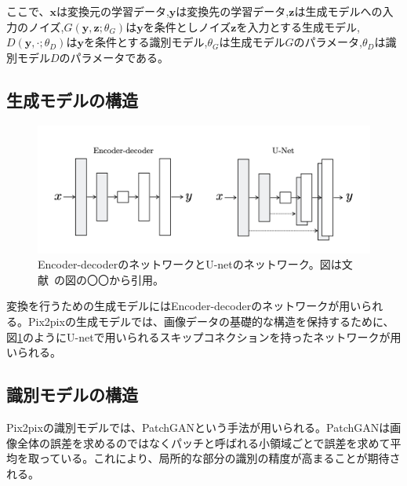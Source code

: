 ここで、$\boldsymbol{x}$は変換元の学習データ,$\boldsymbol{y}$は変換先の学習データ,$\boldsymbol{z}$は生成モデルへの入力のノイズ,$G(\boldsymbol{y},\boldsymbol{z};\theta_G)$は$\boldsymbol{y}$を条件としノイズ$\boldsymbol{z}$を入力とする生成モデル,$D(\boldsymbol{y},\cdot;\theta_D)$は$\boldsymbol{y}$を条件とする識別モデル,$\theta_G$は生成モデル$G$のパラメータ,$\theta_D$は識別モデル$D$のパラメータである。

\subsection{生成モデルの構造}

\begin{figure}[t]
\begin{center}
\includegraphics[width=\hsize]{figure/u-net.png}
\caption{Encoder-decoderのネットワークとU-netのネットワーク。図は文献~\cite{u-net}の図の〇〇から引用。}
\label{fig:u-net}
\end{center}
\end{figure}

変換を行うための生成モデルにはEncoder-decoderのネットワークが用いられる。Pix2pixの生成モデルでは、画像データの基礎的な構造を保持するために、図\ref{fig:u-net}のようにU-net\cite{u-net}で用いられるスキップコネクションを持ったネットワークが用いられる。

\subsection{識別モデルの構造}


Pix2pixの識別モデルでは、PatchGANという手法が用いられる。PatchGANは画像全体の誤差を求めるのではなくパッチと呼ばれる小領域ごとで誤差を求めて平均を取っている。これにより、局所的な部分の識別の精度が高まることが期待される。

